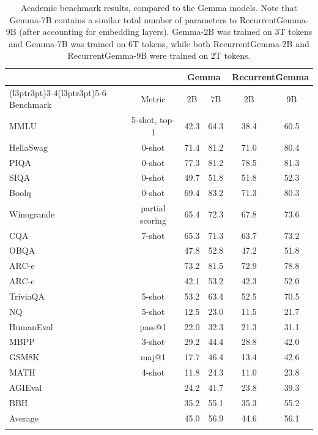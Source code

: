 \documentclass[9pt, a4paper, logo, twocolumn, copyright, nonumbering]{googledeepmind}
\begin{document}
\begin{table}[t]
\vspace{-2mm}
\centering
\caption{Academic benchmark results, compared to the Gemma models. Note that Gemma-7B contains a similar total number of parameters to RecurrentGemma-9B (after accounting for embedding layers). Gemma-2B was trained on 3T tokens and Gemma-7B was trained on 6T tokens, while both RecurrentGemma-2B and RecurrentGemma-9B were trained on 2T tokens.}
\begin{tabular}{l c  c c  c c}
\toprule
& & \multicolumn{2}{c}{Gemma} & \multicolumn{2}{c}{RecurrentGemma} \\
\cmidrule(l{3pt}r{3pt}){3-4}\cmidrule(l{3pt}r{3pt}){5-6}
Benchmark & Metric & 2B & 7B & 2B & 9B \\ \midrule
MMLU & 5-shot, top-1 & 42.3 & 64.3 & 38.4 & 60.5 \\ \hline
HellaSwag & 0-shot & 71.4 & 81.2 & 71.0 & 80.4 \\
PIQA & 0-shot & 77.3 & 81.2 & 78.5 & 81.3 \\
SIQA & 0-shot & 49.7 & 51.8 & 51.8 & 52.3 \\
Boolq & 0-shot & 69.4 & 83.2 & 71.3 & 80.3 \\
Winogrande & partial scoring & 65.4 & 72.3 & 67.8 & 73.6 \\
CQA & 7-shot & 65.3 & 71.3 & 63.7 & 73.2 \\
OBQA &  & 47.8 & 52.8 & 47.2 & 51.8 \\
ARC-e &  & 73.2 & 81.5 & 72.9 & 78.8 \\
ARC-c &  & 42.1 & 53.2 & 42.3 & 52.0 \\ \hline
TriviaQA & 5-shot & 53.2 &  63.4 & 52.5 & 70.5 \\
NQ & 5-shot & 12.5 &  23.0 & 11.5 & 21.7 \\ \hline
HumanEval & pass@1 & 22.0 & 32.3 & 21.3 & 31.1 \\
MBPP & 3-shot & 29.2 & 44.4 & 28.8 & 42.0 \\
GSM8K & maj@1 & 17.7 & 46.4 & 13.4 & 42.6 \\
MATH & 4-shot & 11.8 & 24.3 & 11.0 & 23.8 \\ \hline
AGIEval &  & 24.2 & 41.7 & 23.8 & 39.3 \\
BBH &  & 35.2 & 55.1 & 35.3 & 55.2 \\ \midrule
Average &  & 45.0 & 56.9 & 44.6 & 56.1 \\ \bottomrule
 & \multicolumn{1}{l}{} & \multicolumn{1}{l}{} & \multicolumn{1}{l}{}
\end{tabular} \label{table:evals}
\end{table}
\end{document}
